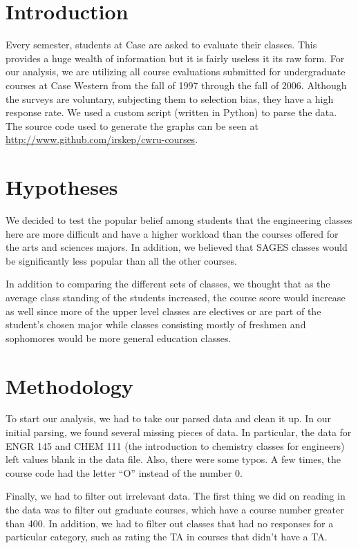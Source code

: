 \documentclass[12pt]{article}
\begin{document}
\maketitle

\section{Introduction}
Every semester, students at Case are asked to evaluate their classes. This provides a huge wealth of information but it is fairly useless it its raw form. For our analysis, we are utilizing all course evaluations submitted for undergraduate courses at Case Western from the fall of 1997 through the fall of 2006. Although the surveys are voluntary, subjecting them to selection bias, they have a high response rate. We used a custom script (written in Python) to parse the data. The source code used to generate the graphs can be seen at \url{http://www.github.com/irskep/cwru-courses}.

\section{Hypotheses}
We decided to test the popular belief among students that the engineering classes here are more difficult and have a higher workload than the courses offered for the arts and sciences majors. In addition, we believed that SAGES classes would be significantly less popular than all the other courses.

In addition to comparing the different sets of classes, we thought that as the average class standing of the students increased, the course score would increase as well since more of the upper level classes are electives or are part of the student's chosen major while classes consisting mostly of freshmen and sophomores would be more general education classes.

\section{Methodology}
To start our analysis, we had to take our parsed data and clean it up. In our initial parsing, we found several missing pieces of data. In particular, the data for ENGR 145 and CHEM 111 (the introduction to chemistry classes for engineers) left values blank in the data file. Also, there were some typos. A few times, the course code had the letter ``O'' instead of the number 0.

Finally, we had to filter out irrelevant data. The first thing we did on reading in the data was to filter out graduate courses, which have a course number greater than 400. In addition, we had to filter out classes that had no responses for a particular category, such as rating the TA in courses that didn't have a TA. 
\end{document}
